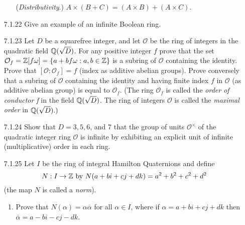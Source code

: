\begin{enumerate}
\begin{enumerate}
               (\textit{Distributivity}.) $A \times (B + C) = (A \times B) +
               (A \times C)$.
      \end{enumerate}
   \item[7.1.22]  Give an example of an infinite Boolean ring.
   \item[7.1.23]  Let $D$ be a squarefree integer, and let $\mathcal{O}$ be the
                  ring of integers in the quadratic field $\mathbb{Q}(\sqrt{D})$. For 
                  any positive integer $f$ prove that the set
                  $\mathcal{O}_f = \mathbb{Z}[f\omega] = \{a + bf\omega : a, b \in \mathbb{Z}\}$
                  is a subring of $\mathcal{O}$ containing the identity. Prove
                  that $[\mathcal{O} : \mathcal{O}_f] = f$ (index as additive
                  abelian groups). Prove conversely that a subring of
                  $\mathcal{O}$ containing the identity and having finite index
                  $f$ in $\mathcal{O}$ (as additive abelian group) is equal to
                  $\mathcal{O}_f$. (The ring $\mathcal{O}_f$ is called the
                  \textit{order of conductor f} in the field $\mathbb{Q}(\sqrt{D})$. The
                  ring of integers $\mathcal{O}$ is called the
                  \textit{maximal order} in $\mathbb{Q}(\sqrt{D}).)$
   \item[7.1.24]  Show that $D = 3, 5, 6$, and 7 that the group of units
                  $\mathcal{O}^\times$ of the quadratic integer ring
                  $\mathcal{O}$  is infinite by exhibiting an explicit unit of
                  infinite (multiplicative) order in each ring.
   \item[7.1.25]  Let $I$ be the ring of integral Hamilton Quaternions and
                  define
                  $$N : I \rightarrow \mathbb{Z} \text{ by }
                    N(a + bi + cj + dk) = a^2 + b^2 + c^2 + d^2$$
                  (the map $N$ is called a \textit{norm}).
                  \begin{enumerate}
                     \item Prove that $N(\alpha) = \alpha\overline{\alpha}$ for
                           all $\alpha \in I$, where if
                           $\alpha = a + bi + cj + dk$ then
                           $\overline{\alpha} = a - bi - cj - dk$.

\end{enumerate}
\end{enumerate}

